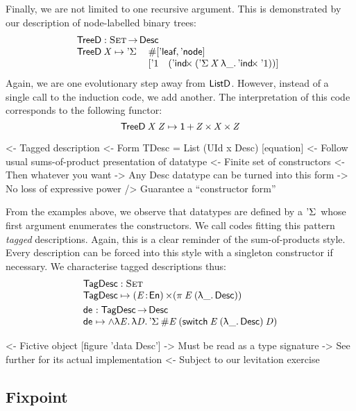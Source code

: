 Finally, we are not limited to one recursive argument. This is
demonstrated by our description of node-labelled binary trees:
%
\[\stk{
\TreeD : \Set \To \Desc \\
\begin{array}{@{}ll}
\TreeD \: \V{X} \mapsto \DSigma{ & \EnumT{\sqr{ \TreeLeaf, \TreeNode }} \\}
  { & \sqr{ \DUnit \quad
       ( \DIndx{(\DSigma{\V{X}}{\LAM{\_}\DIndx{\DUnit}})})} }
\end{array}
}\]
%
Again, we are one evolutionary step away from $\ListD$. However,
instead of a single call to the induction code, we add another. The
interpretation of this code corresponds to the following functor:
%
\[    \TreeD\: \V{X}\: \V{Z} \mapsto \Unit \mathop{\D{+}} 
          \V{Z} \Prod \V{X}  \Prod \V{Z}     \]


\begin{wstructure}
<- Tagged description
    <- Form TDesc = List (UId x Desc) [equation]
    <- Follow usual sums-of-product presentation of datatype
        <- Finite set of constructors
        <- Then whatever you want
    -> Any Desc datatype can be turned into this form
        -> No loss of expressive power
        /> Guarantee a ``constructor form''
\end{wstructure}

From the examples above, we observe that datatypes are defined by a
$\DSigma{\!}{\!}$ whose first argument enumerates the constructors. We
call codes fitting this pattern \emph{tagged} descriptions. Again,
this is a clear reminder of the sum-of-products style. Every
description can be forced into this style with a singleton constructor
if necessary. We characterise tagged descriptions thus:
\[\stk{
 \TagDesc : \Set \\
 \TagDesc \mapsto \SIGMA{\V{E}}{\EnumU} (\spi{\V{E}}{(\LAM{\_} \Desc)})
\smallskip\\
\toDesc{\!} : \TagDesc\To\Desc \\
\toDesc{\!} \mapsto
\spl{\LAM{\V{E}}\LAM{\V{D}}
\DSigma{\EnumT{\V{E}}}{(\F{switch}\:\V{E}\:(\LAM{\_}\Desc)\:\V{D})}}
}\]

\begin{wstructure}
<- Fictive object [figure 'data Desc']
    -> Must be read as a type signature
    -> See further for its actual implementation
        <- Subject to our levitation exercise
\end{wstructure}

\subsection{Fixpoint}
\label{sec:desc-fix-point}

